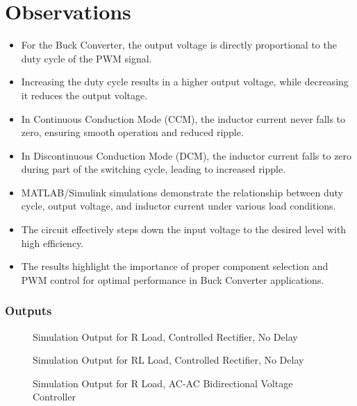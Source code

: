 \documentclass[12pt]{article}
\begin{document}
\section*{Observations}
\begin{itemize}
    \item For the Buck Converter, the output voltage is directly proportional to the duty cycle of the PWM signal.
    \item Increasing the duty cycle results in a higher output voltage, while decreasing it reduces the output voltage.
    \item In Continuous Conduction Mode (CCM), the inductor current never falls to zero, ensuring smooth operation and reduced ripple.
    \item In Discontinuous Conduction Mode (DCM), the inductor current falls to zero during part of the switching cycle, leading to increased ripple.
    \item MATLAB/Simulink simulations demonstrate the relationship between duty cycle, output voltage, and inductor current under various load conditions.
    \item The circuit effectively steps down the input voltage to the desired level with high efficiency.
    \item The results highlight the importance of proper component selection and PWM control for optimal performance in Buck Converter applications.
\end{itemize}


\subsubsection*{Outputs}
\begin{figure}[H]
    \centering
    \caption{Simulation Output for R Load, Controlled Rectifier, No Delay}
    \label{fig:rControlledNoDelay}
\end{figure}

\begin{figure}[H]
    \centering
    \caption{Simulation Output for RL Load, Controlled Rectifier, No Delay}
    \label{fig:rControlledWithDelay}
\end{figure}

\begin{figure}[H]
    \centering
    \caption{Simulation Output for R Load, AC-AC Bidirectional Voltage Controller}
    \label{fig:rLoad}
\end{figure}
\end{document}
